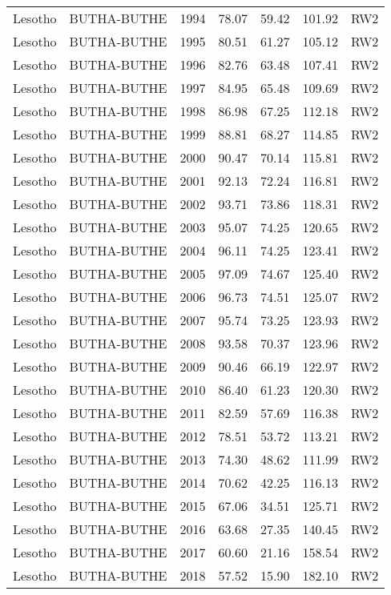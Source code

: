 \begin{longtable}{lllrrrl}
  Lesotho & BUTHA-BUTHE & 1994 & 78.07 & 59.42 & 101.92 & RW2 \\ 
  Lesotho & BUTHA-BUTHE & 1995 & 80.51 & 61.27 & 105.12 & RW2 \\ 
  Lesotho & BUTHA-BUTHE & 1996 & 82.76 & 63.48 & 107.41 & RW2 \\ 
  Lesotho & BUTHA-BUTHE & 1997 & 84.95 & 65.48 & 109.69 & RW2 \\ 
  Lesotho & BUTHA-BUTHE & 1998 & 86.98 & 67.25 & 112.18 & RW2 \\ 
  Lesotho & BUTHA-BUTHE & 1999 & 88.81 & 68.27 & 114.85 & RW2 \\ 
  Lesotho & BUTHA-BUTHE & 2000 & 90.47 & 70.14 & 115.81 & RW2 \\ 
  Lesotho & BUTHA-BUTHE & 2001 & 92.13 & 72.24 & 116.81 & RW2 \\ 
  Lesotho & BUTHA-BUTHE & 2002 & 93.71 & 73.86 & 118.31 & RW2 \\ 
  Lesotho & BUTHA-BUTHE & 2003 & 95.07 & 74.25 & 120.65 & RW2 \\ 
  Lesotho & BUTHA-BUTHE & 2004 & 96.11 & 74.25 & 123.41 & RW2 \\ 
  Lesotho & BUTHA-BUTHE & 2005 & 97.09 & 74.67 & 125.40 & RW2 \\ 
  Lesotho & BUTHA-BUTHE & 2006 & 96.73 & 74.51 & 125.07 & RW2 \\ 
  Lesotho & BUTHA-BUTHE & 2007 & 95.74 & 73.25 & 123.93 & RW2 \\ 
  Lesotho & BUTHA-BUTHE & 2008 & 93.58 & 70.37 & 123.96 & RW2 \\ 
  Lesotho & BUTHA-BUTHE & 2009 & 90.46 & 66.19 & 122.97 & RW2 \\ 
  Lesotho & BUTHA-BUTHE & 2010 & 86.40 & 61.23 & 120.30 & RW2 \\ 
  Lesotho & BUTHA-BUTHE & 2011 & 82.59 & 57.69 & 116.38 & RW2 \\ 
  Lesotho & BUTHA-BUTHE & 2012 & 78.51 & 53.72 & 113.21 & RW2 \\ 
  Lesotho & BUTHA-BUTHE & 2013 & 74.30 & 48.62 & 111.99 & RW2 \\ 
  Lesotho & BUTHA-BUTHE & 2014 & 70.62 & 42.25 & 116.13 & RW2 \\ 
  Lesotho & BUTHA-BUTHE & 2015 & 67.06 & 34.51 & 125.71 & RW2 \\ 
  Lesotho & BUTHA-BUTHE & 2016 & 63.68 & 27.35 & 140.45 & RW2 \\ 
  Lesotho & BUTHA-BUTHE & 2017 & 60.60 & 21.16 & 158.54 & RW2 \\ 
  Lesotho & BUTHA-BUTHE & 2018 & 57.52 & 15.90 & 182.10 & RW2 \\ 

\end{longtable}
